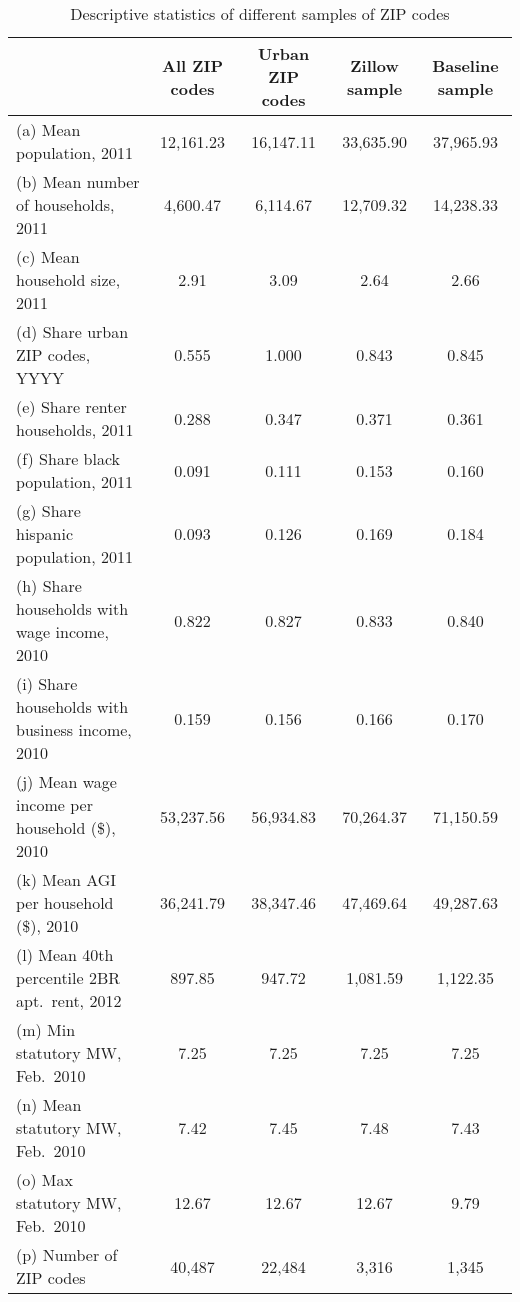 \begin{table}[hbt!] \centering
    \caption{Descriptive statistics of different samples of ZIP codes}
    \label{tab:stats_zip_samples}
    \begin{tabular}{@{}lcccc@{}}
        \toprule
                                                        & \multicolumn{1}{c}{All ZIP codes} 
                                                        & \multicolumn{1}{c}{Urban ZIP codes} 
                                                        & \multicolumn{1}{c}{Zillow sample} 
                                                        & \multicolumn{1}{c}{Baseline sample}      \\ \midrule
        (a) Mean population, 2011                       & 12,161.23 & 16,147.11  & 33,635.90  & 37,965.93    \\
        (b) Mean number of households, 2011             & 4,600.47  & 6,114.67  & 12,709.32  & 14,238.33      \\
        (c) Mean household size, 2011                   & 2.91    & 3.09  & 2.64  & 2.66         \\
        (d) Share urban ZIP codes, YYYY                 & 0.555    & 1.000   & 0.843   & 0.845          \\
        (e) Share renter households, 2011               & 0.288    & 0.347   & 0.371   & 0.361          \\
        (f) Share black population, 2011                & 0.091    & 0.111   & 0.153   & 0.160          \\
        (g) Share hispanic population, 2011             & 0.093    & 0.126   & 0.169   & 0.184          \\
        (h) Share households with wage income, 2010     & 0.822    & 0.827   & 0.833   & 0.840          \\
        (i) Share households with business income, 2010 & 0.159    & 0.156   & 0.166   & 0.170          \\
        (j) Mean wage income per household (\$), 2010   & 53,237.56   & 56,934.83  & 70,264.37  & 71,150.59         \\
        (k) Mean AGI per household (\$), 2010           & 36,241.79   & 38,347.46  & 47,469.64  & 49,287.63         \\
        (l) Mean 40th percentile 2BR apt.\ rent, 2012   & 897.85   & 947.72  & 1,081.59  & 1,122.35         \\
        (m) Min statutory MW, Feb.\ 2010                & 7.25    & 7.25  & 7.25  & 7.25         \\
        (n) Mean statutory MW, Feb.\ 2010               & 7.42    & 7.45  & 7.48  & 7.43         \\
        (o) Max statutory MW, Feb.\ 2010                & 12.67   & 12.67   & 12.67  & 9.79         \\
        (p) Number of ZIP codes                         & 40,487  & 22,484  & 3,316  & 1,345      \\ \bottomrule
    \end{tabular}


\end{table}
